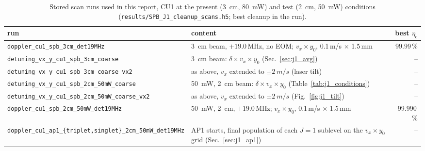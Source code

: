 \documentclass[11pt,a4paper,oneside]{report}
\newcommand{\code}[1]{\texttt{#1}}
\newcommand{\etac}{\eta_{\mathrm{c}}}
\begin{document}
\begin{table}[htbp]
  \centering
  \caption[Stored scan runs, CU1 present and test conditions]{Stored scan runs used in this report, CU1 at the present (\SI{3}{cm}, \SI{80}{mW}) and test (\SI{2}{cm}, \SI{50}{mW}) conditions (\code{results/SPB\_J1\_cleanup\_scans.h5}; best cleanup in the run).}
  \label{tab:runs_present}
  \small
  \begin{tabularx}{\textwidth}{lLr}
    \toprule
    run & content & best $\etac$ \\
    \midrule
    \code{doppler\_cu1\_spb\_3cm\_det19MHz} & \SI{3}{cm} beam, $+19.0$\,MHz, no EOM; $v_x\times y_0$, 0.1\,m/s $\times$ 1.5\,mm & 99.99\,\% \\
    \code{detuning\_vx\_y\_cu1\_spb\_3cm\_coarse} & \SI{3}{cm} beam: $\delta\times v_x\times y_0$ (Sec.~\ref{sec:j1_avg}) & -- \\
    \code{detuning\_vx\_y\_cu1\_spb\_3cm\_coarse\_vx2} & as above, $v_x$ extended to $\pm\SI{2}{m/s}$ (laser tilt) & -- \\
    \code{detuning\_vx\_y\_cu1\_spb\_2cm\_50mW\_coarse} & \SI{50}{mW}, \SI{2}{cm} beam: $\delta\times v_x\times y_0$ (Table~\ref{tab:j1_conditions}) & -- \\
    \code{detuning\_vx\_y\_cu1\_spb\_2cm\_50mW\_coarse\_vx2} & as above, $v_x$ extended to $\pm\SI{2}{m/s}$ (Fig.~\ref{fig:j1_tilt}) & -- \\
    \code{doppler\_cu1\_spb\_2cm\_50mW\_det19MHz} & \SI{50}{mW}, \SI{2}{cm}, $+19.0$\,MHz; $v_x\times y_0$, 0.1\,m/s $\times$ 1.5\,mm & 99.990\,\% \\
    \code{doppler\_cu1\_ap1\_\{triplet,singlet\}\_2cm\_50mW\_det19MHz} & AP1 starts, final population of each $J=1$ sublevel on the $v_x\times y_0$ grid (Sec.~\ref{sec:j1_ap1}) & -- \\
    \bottomrule
  \end{tabularx}
\end{table}
\end{document}
